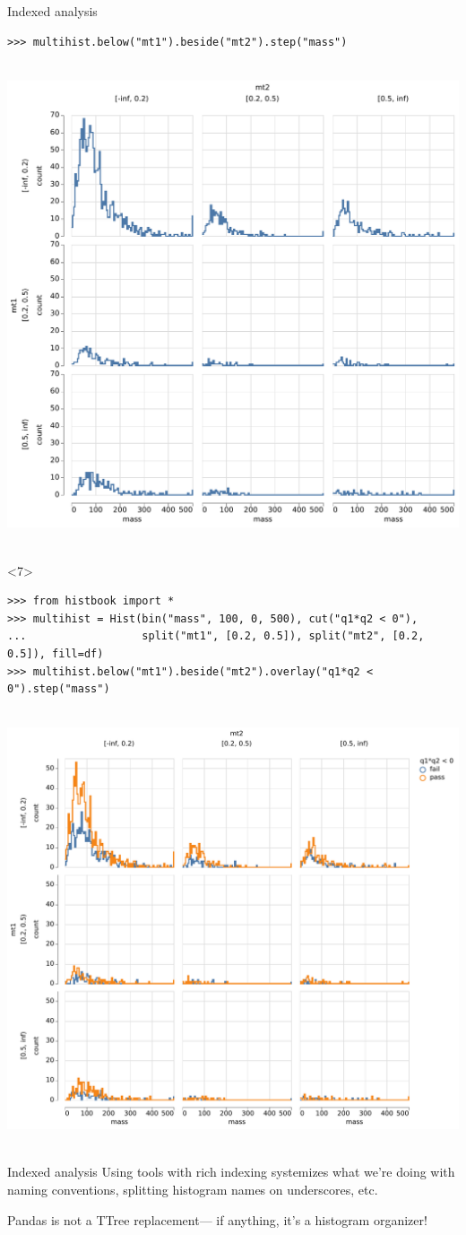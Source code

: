 \documentclass[aspectratio=169]{beamer}
\begin{document}
\begin{frame}[fragile]{Indexed analysis}
\begin{onlyenv}
\begin{verbatim}
>>> multihist.below("mt1").beside("mt2").step("mass")
\end{verbatim}
\mbox{ } \hfill \includegraphics[height=7 cm]{pandhist_double_trellis.pdf} \hfill \mbox{ }
\end{onlyenv}
\begin{onlyenv}<7>
\scriptsize
\begin{verbatim}
>>> from histbook import *
>>> multihist = Hist(bin("mass", 100, 0, 500), cut("q1*q2 < 0"),
...                  split("mt1", [0.2, 0.5]), split("mt2", [0.2, 0.5]), fill=df)
>>> multihist.below("mt1").beside("mt2").overlay("q1*q2 < 0").step("mass")
\end{verbatim}
\mbox{ } \hfill \includegraphics[height=7 cm]{pandhist_double_trellis_overlay.pdf} \hfill \mbox{ }
\end{onlyenv}
\end{frame}

\begin{frame}{Indexed analysis}
\Large
\vspace{0.5 cm}
Using tools with rich indexing systemizes what we're doing with naming conventions, splitting histogram names on underscores, etc.

\vspace{1 cm}
Pandas is not a TTree replacement--- if anything, it's a histogram organizer!

\vspace{1 cm}
\end{frame}
\end{document}

